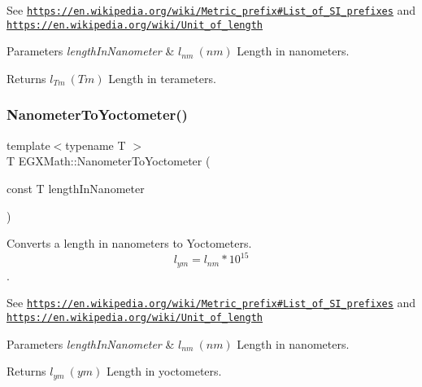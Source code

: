 See \href{https://en.wikipedia.org/wiki/Metric_prefix#List_of_SI_prefixes}{\tt https\+://en.\+wikipedia.\+org/wiki/\+Metric\+\_\+prefix\#\+List\+\_\+of\+\_\+\+S\+I\+\_\+prefixes} and \href{https://en.wikipedia.org/wiki/Unit_of_length}{\tt https\+://en.\+wikipedia.\+org/wiki/\+Unit\+\_\+of\+\_\+length} 
\begin{DoxyParams}{Parameters}
{\em length\+In\+Nanometer} & $ l_{nm}\ (nm)$ Length in nanometers. \\
\hline
\end{DoxyParams}
\begin{DoxyReturn}{Returns}
$ l_{Tm}\ (Tm)$ Length in terameters. 
\end{DoxyReturn}
\mbox{\label{group___e_g_x_math-_conversions-_length_conversions-_nanometer-_s_i_gab447c3aa3d215a1030a63e28f9aca1c1}} 
\subsubsection{\texorpdfstring{Nanometer\+To\+Yoctometer()}{NanometerToYoctometer()}}
{\footnotesize\ttfamily template$<$typename T $>$ \\
T E\+G\+X\+Math\+::\+Nanometer\+To\+Yoctometer (\begin{DoxyParamCaption}\item[{const T}]{length\+In\+Nanometer }\end{DoxyParamCaption})}



Converts a length in nanometers to Yoctometers. \[ l_{ym}=l_{nm} * 10^{15} \]. 

See \href{https://en.wikipedia.org/wiki/Metric_prefix#List_of_SI_prefixes}{\tt https\+://en.\+wikipedia.\+org/wiki/\+Metric\+\_\+prefix\#\+List\+\_\+of\+\_\+\+S\+I\+\_\+prefixes} and \href{https://en.wikipedia.org/wiki/Unit_of_length}{\tt https\+://en.\+wikipedia.\+org/wiki/\+Unit\+\_\+of\+\_\+length} 
\begin{DoxyParams}{Parameters}
{\em length\+In\+Nanometer} & $ l_{nm}\ (nm)$ Length in nanometers. \\
\hline
\end{DoxyParams}
\begin{DoxyReturn}{Returns}
$ l_{ym}\ (ym)$ Length in yoctometers. 
\end{DoxyReturn}
\mbox{\label{group___e_g_x_math-_conversions-_length_conversions-_nanometer-_s_i_ga986e80d7ab490fdc59ebbc2d7473bda3}} 
